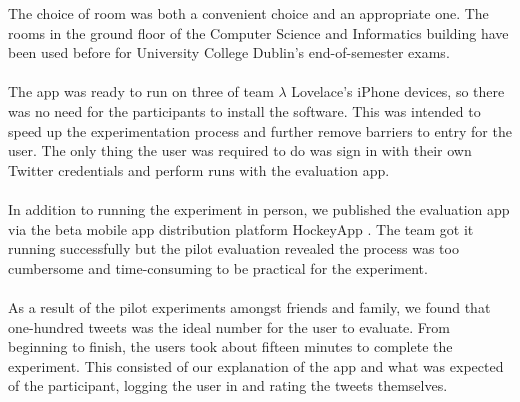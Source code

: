 \documentclass{article}
\begin{document}

The choice of room was both a convenient choice and an appropriate one. The rooms in the ground floor of the Computer Science and Informatics building have been used before for University College Dublin's end-of-semester exams. 
\\\\
The app was ready to run on three of team $\lambda$ Lovelace's iPhone devices, so there was no need for the participants to install the software. This was intended to speed up the experimentation process and further remove barriers to entry for the user. The only thing the user was required to do was sign in with their own Twitter credentials and perform runs with the evaluation app.
\\\\
In addition to running the experiment in person, we published the evaluation app via the beta mobile app distribution platform HockeyApp \cite{hockeyapp}. The team got it running successfully but the pilot evaluation revealed the process was too cumbersome and time-consuming to be practical for the experiment.
\\\\
As a result of the pilot experiments amongst friends and family, we found that one-hundred tweets was the ideal number for the user to evaluate. From beginning to finish, the users took about fifteen minutes to complete the experiment. This consisted of our explanation of the app and what was expected of the participant, logging the user in and rating the tweets themselves. 
\end{document}
